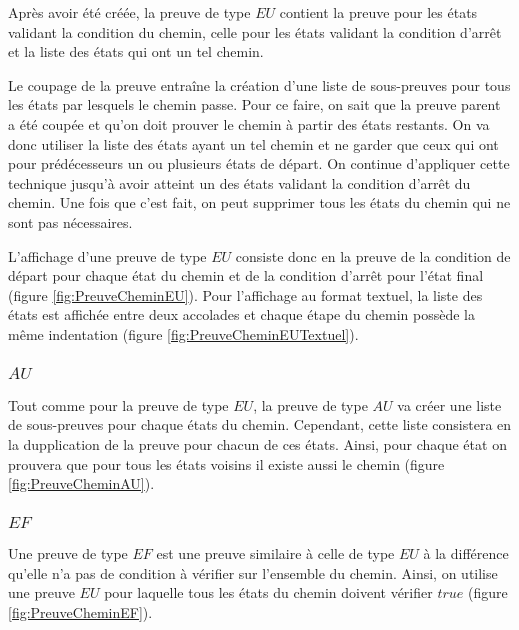 \documentclass[dvipsnames]{report}
\begin{document}
Après avoir été créée, la preuve de type $EU$ contient la preuve pour les états validant la condition du chemin, celle pour les états validant la condition d'arrêt et la liste des états qui ont un tel chemin.

Le coupage de la preuve entraîne la création d'une liste de sous-preuves pour tous les états par lesquels le chemin passe. Pour ce faire, on sait que la preuve parent a été coupée et qu'on doit prouver le chemin à partir des états restants. On va donc utiliser la liste des états ayant un tel chemin et ne garder que ceux qui ont pour prédécesseurs un ou plusieurs états de départ. On continue d'appliquer cette technique jusqu'à avoir atteint un des états validant la condition d'arrêt du chemin. Une fois que c'est fait, on peut supprimer tous les états du chemin qui ne sont pas nécessaires.

L'affichage d'une preuve de type $EU$ consiste donc en la preuve de la condition de départ pour chaque état du chemin et de la condition d'arrêt pour l'état final (figure \ref{fig:PreuveCheminEU}). Pour l'affichage au format textuel, la liste des états est affichée entre deux accolades et chaque étape du chemin possède la même indentation (figure \ref{fig:PreuveCheminEUTextuel}).



\subsubsection{$AU$}

Tout comme pour la preuve de type $EU$, la preuve de type $AU$ va créer une liste de sous-preuves pour chaque états du chemin. Cependant, cette liste consistera en la dupplication de la preuve pour chacun de ces états. Ainsi, pour chaque état on prouvera que pour tous les états voisins il existe aussi le chemin (figure \ref{fig:PreuveCheminAU}).



\subsubsection{$EF$}

Une preuve de type $EF$ est une preuve similaire à celle de type $EU$ à la différence qu'elle n'a pas de condition à vérifier sur l'ensemble du chemin. Ainsi, on utilise une preuve $EU$ pour laquelle tous les états du chemin doivent vérifier $true$ (figure \ref{fig:PreuveCheminEF}).
\end{document}
